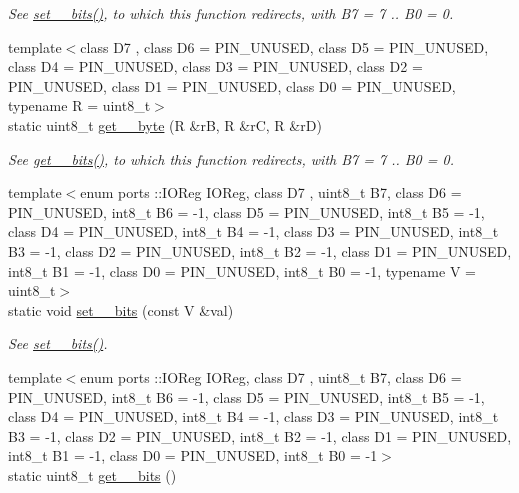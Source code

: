 \begin{DoxyCompactItemize}
\begin{DoxyCompactList}\small\item\em See \hyperlink{namespaceports_aac15fb87d8fede3f2bf8d764ab42965f}{set\+\_\+\_\+bits()}, to which this function redirects, with {\ttfamily B7 = 7} .. {\ttfamily B0 = 0}. \end{DoxyCompactList}\item 
{\footnotesize template$<$class D7 , class D6  = P\+I\+N\+\_\+\+U\+N\+U\+S\+ED, class D5  = P\+I\+N\+\_\+\+U\+N\+U\+S\+ED, class D4  = P\+I\+N\+\_\+\+U\+N\+U\+S\+ED, class D3  = P\+I\+N\+\_\+\+U\+N\+U\+S\+ED, class D2  = P\+I\+N\+\_\+\+U\+N\+U\+S\+ED, class D1  = P\+I\+N\+\_\+\+U\+N\+U\+S\+ED, class D0  = P\+I\+N\+\_\+\+U\+N\+U\+S\+ED, typename R  = uint8\+\_\+t$>$ }\\static uint8\+\_\+t \hyperlink{namespaceports_ae7d1ffc9ed6454ca61b006ffe43e4e6e}{get\+\_\+\_\+byte} (R \&rB, R \&rC, R \&rD)
\begin{DoxyCompactList}\small\item\em See \hyperlink{namespaceports_a9a1959ec95780c00a964b174a27b2a37}{get\+\_\+\_\+bits()}, to which this function redirects, with {\ttfamily B7 = 7} .. {\ttfamily B0 = 0}. \end{DoxyCompactList}\item 
{\footnotesize template$<$enum ports \+::\+I\+O\+Reg I\+O\+Reg, class D7 , uint8\+\_\+t B7, class D6  = P\+I\+N\+\_\+\+U\+N\+U\+S\+ED, int8\+\_\+t B6 = -\/1, class D5  = P\+I\+N\+\_\+\+U\+N\+U\+S\+ED, int8\+\_\+t B5 = -\/1, class D4  = P\+I\+N\+\_\+\+U\+N\+U\+S\+ED, int8\+\_\+t B4 = -\/1, class D3  = P\+I\+N\+\_\+\+U\+N\+U\+S\+ED, int8\+\_\+t B3 = -\/1, class D2  = P\+I\+N\+\_\+\+U\+N\+U\+S\+ED, int8\+\_\+t B2 = -\/1, class D1  = P\+I\+N\+\_\+\+U\+N\+U\+S\+ED, int8\+\_\+t B1 = -\/1, class D0  = P\+I\+N\+\_\+\+U\+N\+U\+S\+ED, int8\+\_\+t B0 = -\/1, typename V  = uint8\+\_\+t$>$ }\\static void \hyperlink{namespaceports_ac9262ca010e65ff684986eef2900942f}{set\+\_\+\_\+bits} (const V \&val)
\begin{DoxyCompactList}\small\item\em See \hyperlink{namespaceports_aac15fb87d8fede3f2bf8d764ab42965f}{set\+\_\+\_\+bits()}. \end{DoxyCompactList}\item 
{\footnotesize template$<$enum ports \+::\+I\+O\+Reg I\+O\+Reg, class D7 , uint8\+\_\+t B7, class D6  = P\+I\+N\+\_\+\+U\+N\+U\+S\+ED, int8\+\_\+t B6 = -\/1, class D5  = P\+I\+N\+\_\+\+U\+N\+U\+S\+ED, int8\+\_\+t B5 = -\/1, class D4  = P\+I\+N\+\_\+\+U\+N\+U\+S\+ED, int8\+\_\+t B4 = -\/1, class D3  = P\+I\+N\+\_\+\+U\+N\+U\+S\+ED, int8\+\_\+t B3 = -\/1, class D2  = P\+I\+N\+\_\+\+U\+N\+U\+S\+ED, int8\+\_\+t B2 = -\/1, class D1  = P\+I\+N\+\_\+\+U\+N\+U\+S\+ED, int8\+\_\+t B1 = -\/1, class D0  = P\+I\+N\+\_\+\+U\+N\+U\+S\+ED, int8\+\_\+t B0 = -\/1$>$ }\\static uint8\+\_\+t \hyperlink{namespaceports_a2a0a17506421aaa10b7c087124a09b72}{get\+\_\+\_\+bits} ()

\end{DoxyCompactItemize}
